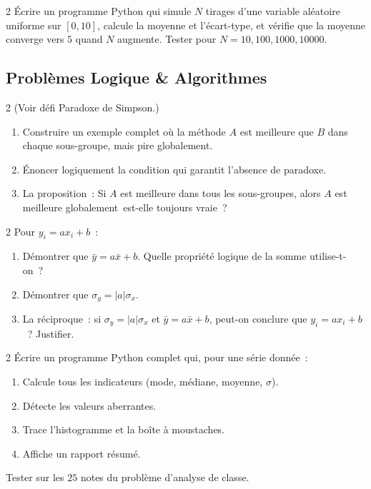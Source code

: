 \begin{exo}{2}
\'Ecrire un programme Python qui simule $N$ tirages d'une variable al\'eatoire
uniforme sur $[0,10]$, calcule la moyenne et l'\'ecart-type, et v\'erifie
que la moyenne converge vers $5$ quand $N$ augmente.
Tester pour $N=10, 100, 1000, 10000$.
\end{exo}

\subsection*{Probl\`emes Logique \& Algorithmes}

\begin{probleme}{2}
(Voir d\'efi Paradoxe de Simpson.)
\begin{enumerate}
  \item Construire un exemple complet o\`u la m\'ethode $A$ est meilleure
        que $B$ dans chaque sous-groupe, mais pire globalement.
  \item \'Enoncer logiquement la condition qui garantit l'absence de paradoxe.
  \item La proposition~: \og Si $A$ est meilleure dans tous les sous-groupes,
        alors $A$ est meilleure globalement\fg\ est-elle toujours vraie~?
\end{enumerate}
\end{probleme}

\begin{probleme}{2}
Pour $y_i=ax_i+b$~:
\begin{enumerate}
  \item D\'emontrer que $\bar{y}=a\bar{x}+b$.
        Quelle propri\'et\'e logique de la somme utilise-t-on~?
  \item D\'emontrer que $\sigma_y=|a|\sigma_x$.
  \item La r\'eciproque~: si $\sigma_y=|a|\sigma_x$ et $\bar{y}=a\bar{x}+b$,
        peut-on conclure que $y_i=ax_i+b$~? Justifier.
\end{enumerate}
\end{probleme}

\begin{probleme}{2}
\'Ecrire un programme Python complet qui, pour une s\'erie donn\'ee~:
\begin{enumerate}
  \item Calcule tous les indicateurs (mode, m\'ediane, moyenne, $\sigma$).
  \item D\'etecte les valeurs aberrantes.
  \item Trace l'histogramme et la bo\^ite \`a moustaches.
  \item Affiche un rapport r\'esum\'e.
\end{enumerate}
Tester sur les $25$ notes du probl\`eme d'analyse de classe.
\end{probleme}

